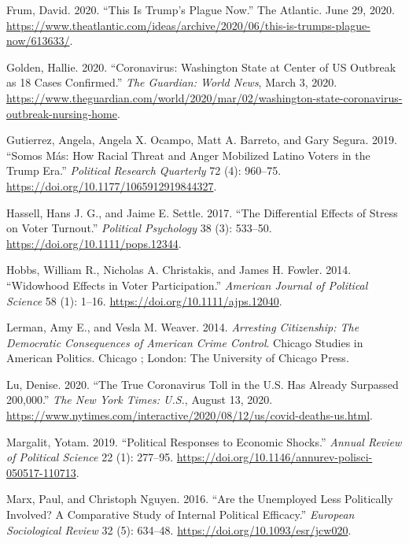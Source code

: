 \documentclass[
  12pt,
]{article}
\newlength{\cslhangindent}
\newenvironment{cslreferences}%
  {\setlength{\parindent}{0pt}%
  \everypar{\setlength{\hangindent}{\cslhangindent}}\ignorespaces}%
  {\par}
\begin{document}
\begin{cslreferences}
\leavevmode\hypertarget{ref-Frum2020}{}%
Frum, David. 2020. ``This Is Trump's Plague Now.'' The Atlantic. June 29, 2020. \url{https://www.theatlantic.com/ideas/archive/2020/06/this-is-trumps-plague-now/613633/}.

\leavevmode\hypertarget{ref-Golden2020}{}%
Golden, Hallie. 2020. ``Coronavirus: Washington State at Center of US Outbreak as 18 Cases Confirmed.'' \emph{The Guardian: World News}, March 3, 2020. \url{https://www.theguardian.com/world/2020/mar/02/washington-state-coronavirus-outbreak-nursing-home}.

\leavevmode\hypertarget{ref-Gutierrez2019}{}%
Gutierrez, Angela, Angela X. Ocampo, Matt A. Barreto, and Gary Segura. 2019. ``Somos Más: How Racial Threat and Anger Mobilized Latino Voters in the Trump Era.'' \emph{Political Research Quarterly} 72 (4): 960--75. \url{https://doi.org/10.1177/1065912919844327}.

\leavevmode\hypertarget{ref-Hassell2017}{}%
Hassell, Hans J. G., and Jaime E. Settle. 2017. ``The Differential Effects of Stress on Voter Turnout.'' \emph{Political Psychology} 38 (3): 533--50. \url{https://doi.org/10.1111/pops.12344}.

\leavevmode\hypertarget{ref-Hobbs2014}{}%
Hobbs, William R., Nicholas A. Christakis, and James H. Fowler. 2014. ``Widowhood Effects in Voter Participation.'' \emph{American Journal of Political Science} 58 (1): 1--16. \url{https://doi.org/10.1111/ajps.12040}.

\leavevmode\hypertarget{ref-Lerman2014}{}%
Lerman, Amy E., and Vesla M. Weaver. 2014. \emph{Arresting Citizenship: The Democratic Consequences of American Crime Control}. Chicago Studies in American Politics. Chicago ; London: The University of Chicago Press.

\leavevmode\hypertarget{ref-Lu2020}{}%
Lu, Denise. 2020. ``The True Coronavirus Toll in the U.S. Has Already Surpassed 200,000.'' \emph{The New York Times: U.S.}, August 13, 2020. \url{https://www.nytimes.com/interactive/2020/08/12/us/covid-deaths-us.html}.

\leavevmode\hypertarget{ref-Margalit2019}{}%
Margalit, Yotam. 2019. ``Political Responses to Economic Shocks.'' \emph{Annual Review of Political Science} 22 (1): 277--95. \url{https://doi.org/10.1146/annurev-polisci-050517-110713}.

\leavevmode\hypertarget{ref-Marx2016}{}%
Marx, Paul, and Christoph Nguyen. 2016. ``Are the Unemployed Less Politically Involved? A Comparative Study of Internal Political Efficacy.'' \emph{European Sociological Review} 32 (5): 634--48. \url{https://doi.org/10.1093/esr/jcw020}.


\end{cslreferences}
\end{document}
